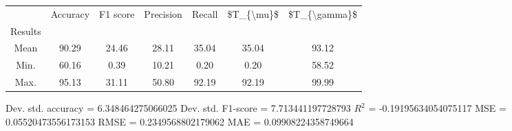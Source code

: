 \begin{tabular}{|c|c|c|c|c|c|c|}
\toprule
{} &  Accuracy &  F1 score &  Precision &  Recall &  \$T\_\{\textbackslash mu\}\$ &  \$T\_\{\textbackslash gamma\}\$ \\
Results &           &           &            &         &            &               \\
\hline
Mean    &     90.29 &     24.46 &      28.11 &   35.04 &      35.04 &         93.12 \\
Min.    &     60.16 &      0.39 &      10.21 &    0.20 &       0.20 &         58.52 \\
Max.    &     95.13 &     31.11 &      50.80 &   92.19 &      92.19 &         99.99 \\
\bottomrule
\end{tabular}

 Dev. std. accuracy = 6.348464275066025
 Dev. std. F1-score = 7.713441197728793
 $R^2$ = -0.19195634054075117
 MSE = 0.05520473556173153
 RMSE = 0.2349568802179062
 MAE = 0.09908224358749664